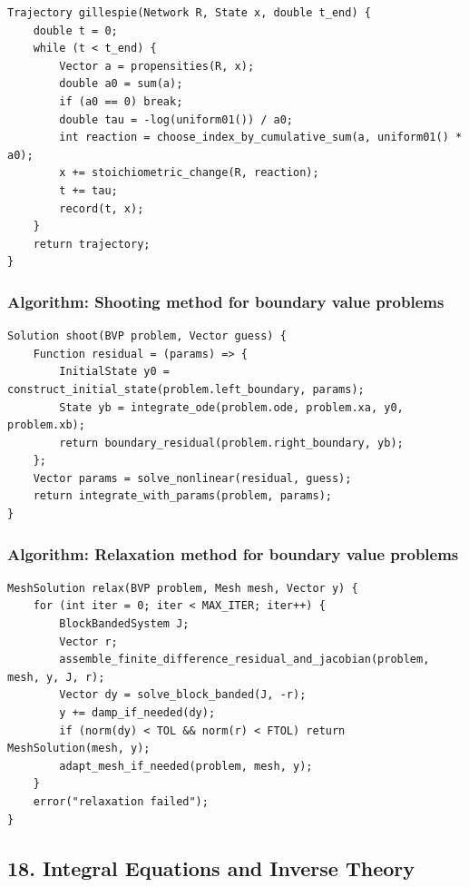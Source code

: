\documentclass[11pt]{article}
\begin{document}
\begin{verbatim}
Trajectory gillespie(Network R, State x, double t_end) {
    double t = 0;
    while (t < t_end) {
        Vector a = propensities(R, x);
        double a0 = sum(a);
        if (a0 == 0) break;
        double tau = -log(uniform01()) / a0;
        int reaction = choose_index_by_cumulative_sum(a, uniform01() * a0);
        x += stoichiometric_change(R, reaction);
        t += tau;
        record(t, x);
    }
    return trajectory;
}
\end{verbatim}

\subsubsection{Algorithm: Shooting method for boundary value problems}\label{algorithm-shooting-method-for-boundary-value-problems}

\begin{verbatim}
Solution shoot(BVP problem, Vector guess) {
    Function residual = (params) => {
        InitialState y0 = construct_initial_state(problem.left_boundary, params);
        State yb = integrate_ode(problem.ode, problem.xa, y0, problem.xb);
        return boundary_residual(problem.right_boundary, yb);
    };
    Vector params = solve_nonlinear(residual, guess);
    return integrate_with_params(problem, params);
}
\end{verbatim}

\subsubsection{Algorithm: Relaxation method for boundary value problems}\label{algorithm-relaxation-method-for-boundary-value-problems}

\begin{verbatim}
MeshSolution relax(BVP problem, Mesh mesh, Vector y) {
    for (int iter = 0; iter < MAX_ITER; iter++) {
        BlockBandedSystem J;
        Vector r;
        assemble_finite_difference_residual_and_jacobian(problem, mesh, y, J, r);
        Vector dy = solve_block_banded(J, -r);
        y += damp_if_needed(dy);
        if (norm(dy) < TOL && norm(r) < FTOL) return MeshSolution(mesh, y);
        adapt_mesh_if_needed(problem, mesh, y);
    }
    error("relaxation failed");
}
\end{verbatim}

\subsection{18. Integral Equations and Inverse Theory}\label{integral-equations-and-inverse-theory}
\end{document}
